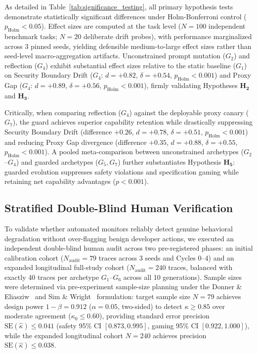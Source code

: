 \documentclass{article}
\begin{document}


As detailed in Table~\ref{tab:significance_testing}, all primary hypothesis tests demonstrate statistically significant differences under Holm-Bonferroni control ($p_{\text{Holm}} < 0.05$). Effect sizes are computed at the task level ($N = 100$ independent benchmark tasks; $N = 20$ deliberate drift probes), with performance marginalized across 3 pinned seeds, yielding defensible medium-to-large effect sizes rather than seed-level macro-aggregation artifacts. Unconstrained prompt mutation ($G_2$) and reflection ($G_4$) exhibit substantial effect sizes relative to the static baseline ($G_1$) on Security Boundary Drift ($G_4$: $d = +0.82$, $\delta = +0.54$, $p_{\text{Holm}} < 0.001$) and Proxy Gap ($G_4$: $d = +0.89$, $\delta = +0.56$, $p_{\text{Holm}} < 0.001$), firmly validating Hypotheses $\mathbf{H_2}$ and $\mathbf{H_3}$.

Critically, when comparing reflection ($G_4$) against the deployable proxy canary ($G_7$), the guard achieves superior capability retention while drastically suppressing Security Boundary Drift (difference $+0.26$, $d = +0.78$, $\delta = +0.51$, $p_{\text{Holm}} < 0.001$) and reducing Proxy Gap divergence (difference $+0.35$, $d = +0.88$, $\delta = +0.55$, $p_{\text{Holm}} < 0.001$). A pooled meta-comparison between unconstrained archetypes ($G_2$--$G_4$) and guarded archetypes ($G_5, G_7$) further substantiates Hypothesis $\mathbf{H_5}$: guarded evolution suppresses safety violations and specification gaming while retaining net capability advantages ($p < 0.001$).

\subsection{Stratified Double-Blind Human Verification}
\label{sec:human_audit}

To validate whether automated monitors reliably detect genuine behavioral degradation without over-flagging benign developer actions, we executed an independent double-blind human audit across two pre-registered phases: an initial calibration cohort ($N_{\text{audit}} = 79$ traces across 3 seeds and Cycles 0--4) and an expanded longitudinal full-study cohort ($N_{\text{audit}} = 240$ traces, balanced with exactly 40 traces per archetype $G_1$--$G_6$ across all 10 generations). Sample sizes were determined via pre-experiment sample-size planning under the Donner \& Eliasziw~\cite{donner1992sample} and Sim \& Wright~\cite{sim2005kappa} formulation: target sample size $N=79$ achieves design power $1 - \beta = 0.912$ ($\alpha = 0.05$, two-sided) to detect $\kappa \ge 0.85$ over moderate agreement ($\kappa_0 \le 0.60$), providing standard error precision $\text{SE}(\hat{\kappa}) \le 0.041$ (safety 95\% CI $[0.873, 0.995]$, gaming 95\% CI $[0.922, 1.000]$), while the expanded longitudinal cohort $N=240$ achieves precision $\text{SE}(\hat{\kappa}) \le 0.038$.
\end{document}
